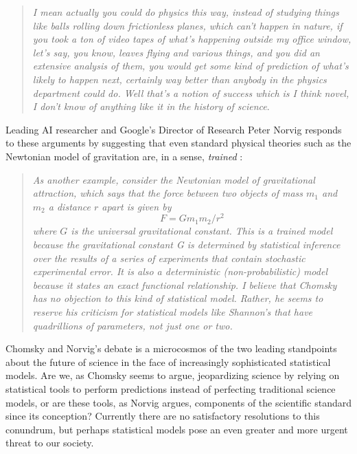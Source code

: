 \documentclass[jair,twoside,11pt,theapa]{article}
\begin{document}
\begin{quotation}
\textsl{I mean actually you could do physics this way, instead of studying things like balls rolling down frictionless planes, which can't happen in nature, if you took a ton of video tapes of what's happening outside my office window, let's say, you know, leaves flying and various things, and you did an extensive analysis of them, you would get some kind of prediction of what's likely to happen next, certainly way better than anybody in the physics department could do. Well that's a notion of success which is I think novel, I don't know of anything like it in the history of science}.
\end{quotation}

Leading AI researcher and Google's Director of Research Peter Norvig responds to these arguments by suggesting that even standard physical theories such as the Newtonian model of gravitation are, in a sense, \emph{trained} \cite{norvig2017chomsky}:

\begin{quotation}
\textsl{As another example, consider the Newtonian model of gravitational attraction, which says that the force between two objects of mass $m_1$ and $m_2$ a distance $r$ apart is given by}
\begin{equation*}
F = G m_1 m_2 / r^2
\end{equation*}
\textsl{where $G$ is the universal gravitational constant. This is a trained model because the gravitational constant G is determined by statistical inference over the results of a series of experiments that contain stochastic experimental error. It is also a deterministic (non-probabilistic) model because it states an exact functional relationship. I believe that Chomsky has no objection to this kind of statistical model. Rather, he seems to reserve his criticism for statistical models like Shannon's that have quadrillions of parameters, not just one or two.}
\end{quotation}

Chomsky and Norvig's debate \cite{norvig2017chomsky} is a microcosmos of the two leading standpoints about the future of science in the face of increasingly sophisticated statistical models. Are we, as Chomsky seems to argue, jeopardizing science by relying on statistical tools to perform predictions instead of perfecting traditional science models, or are these tools, as Norvig argues, components of the scientific standard since its conception? Currently there are no satisfactory resolutions to this conundrum, but perhaps statistical models pose an even greater and more urgent threat to our society. 
\end{document}

